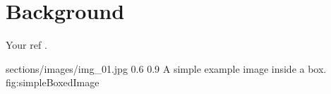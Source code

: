 \documentclass[../../../main.tex]{subfiles}
\begin{document}
\section{Background}
Your ref \parencite{Hang2024}.

\begin{centerBoxImageStyle}
    {sections/images/img_01.jpg}     
    {0.6\linewidth}                         
    {0.9\linewidth}                         
    {A simple example image inside a box.}  
    {fig:simpleBoxedImage}               
\end{centerBoxImageStyle}
\end{document}
